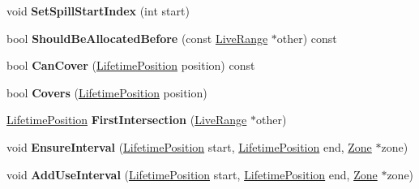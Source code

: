 \begin{DoxyCompactItemize}
\item 
\hypertarget{classv8_1_1internal_1_1_live_range_a8771fd7ef29604d13eb2fc27a88c0eb9}{}void {\bfseries Set\+Spill\+Start\+Index} (int start)\label{classv8_1_1internal_1_1_live_range_a8771fd7ef29604d13eb2fc27a88c0eb9}

\item 
\hypertarget{classv8_1_1internal_1_1_live_range_a64375493acd5aceb780a8c67f6489f96}{}bool {\bfseries Should\+Be\+Allocated\+Before} (const \hyperlink{classv8_1_1internal_1_1_live_range}{Live\+Range} $\ast$other) const \label{classv8_1_1internal_1_1_live_range_a64375493acd5aceb780a8c67f6489f96}

\item 
\hypertarget{classv8_1_1internal_1_1_live_range_a75657b5678d8188045ec6be9b3fce06c}{}bool {\bfseries Can\+Cover} (\hyperlink{classv8_1_1internal_1_1_lifetime_position}{Lifetime\+Position} position) const \label{classv8_1_1internal_1_1_live_range_a75657b5678d8188045ec6be9b3fce06c}

\item 
\hypertarget{classv8_1_1internal_1_1_live_range_a096c7f4e9cc4ee5a9ababe8f6f4476b0}{}bool {\bfseries Covers} (\hyperlink{classv8_1_1internal_1_1_lifetime_position}{Lifetime\+Position} position)\label{classv8_1_1internal_1_1_live_range_a096c7f4e9cc4ee5a9ababe8f6f4476b0}

\item 
\hypertarget{classv8_1_1internal_1_1_live_range_a6eefd64ee4a61221be0685caae202b77}{}\hyperlink{classv8_1_1internal_1_1_lifetime_position}{Lifetime\+Position} {\bfseries First\+Intersection} (\hyperlink{classv8_1_1internal_1_1_live_range}{Live\+Range} $\ast$other)\label{classv8_1_1internal_1_1_live_range_a6eefd64ee4a61221be0685caae202b77}

\item 
\hypertarget{classv8_1_1internal_1_1_live_range_a08a9a6f61273cbdf10d2c0bd3f5f8694}{}void {\bfseries Ensure\+Interval} (\hyperlink{classv8_1_1internal_1_1_lifetime_position}{Lifetime\+Position} start, \hyperlink{classv8_1_1internal_1_1_lifetime_position}{Lifetime\+Position} end, \hyperlink{classv8_1_1internal_1_1_zone}{Zone} $\ast$zone)\label{classv8_1_1internal_1_1_live_range_a08a9a6f61273cbdf10d2c0bd3f5f8694}

\item 
\hypertarget{classv8_1_1internal_1_1_live_range_a84040c33ef48af318b72ba81e80ab57f}{}void {\bfseries Add\+Use\+Interval} (\hyperlink{classv8_1_1internal_1_1_lifetime_position}{Lifetime\+Position} start, \hyperlink{classv8_1_1internal_1_1_lifetime_position}{Lifetime\+Position} end, \hyperlink{classv8_1_1internal_1_1_zone}{Zone} $\ast$zone)\label{classv8_1_1internal_1_1_live_range_a84040c33ef48af318b72ba81e80ab57f}


\end{DoxyCompactItemize}
